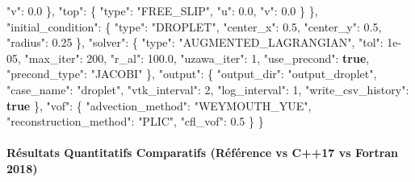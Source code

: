 \documentclass[
  10pt,
]{article}
\newenvironment{Shaded}{}{}
\newcommand{\DataTypeTok}[1]{\textcolor[rgb]{0.56,0.13,0.00}{#1}}
\newcommand{\DecValTok}[1]{\textcolor[rgb]{0.25,0.63,0.44}{#1}}
\newcommand{\FloatTok}[1]{\textcolor[rgb]{0.25,0.63,0.44}{#1}}
\newcommand{\FunctionTok}[1]{\textcolor[rgb]{0.02,0.16,0.49}{#1}}
\newcommand{\KeywordTok}[1]{\textcolor[rgb]{0.00,0.44,0.13}{\textbf{#1}}}
\newcommand{\StringTok}[1]{\textcolor[rgb]{0.25,0.44,0.63}{#1}}
\begin{document}
\begin{Shaded}
\begin{Highlighting}[]
      \DataTypeTok{"v"}\FunctionTok{:} \FloatTok{0.0}
    \FunctionTok{\},}
    \DataTypeTok{"top"}\FunctionTok{:} \FunctionTok{\{}
      \DataTypeTok{"type"}\FunctionTok{:} \StringTok{"FREE\_SLIP"}\FunctionTok{,}
      \DataTypeTok{"u"}\FunctionTok{:} \FloatTok{0.0}\FunctionTok{,}
      \DataTypeTok{"v"}\FunctionTok{:} \FloatTok{0.0}
    \FunctionTok{\}}
  \FunctionTok{\},}
  \DataTypeTok{"initial\_condition"}\FunctionTok{:} \FunctionTok{\{}
    \DataTypeTok{"type"}\FunctionTok{:} \StringTok{"DROPLET"}\FunctionTok{,}
    \DataTypeTok{"center\_x"}\FunctionTok{:} \FloatTok{0.5}\FunctionTok{,}
    \DataTypeTok{"center\_y"}\FunctionTok{:} \FloatTok{0.5}\FunctionTok{,}
    \DataTypeTok{"radius"}\FunctionTok{:} \FloatTok{0.25}
  \FunctionTok{\},}
  \DataTypeTok{"solver"}\FunctionTok{:} \FunctionTok{\{}
    \DataTypeTok{"type"}\FunctionTok{:} \StringTok{"AUGMENTED\_LAGRANGIAN"}\FunctionTok{,}
    \DataTypeTok{"tol"}\FunctionTok{:} \DecValTok{1e{-}05}\FunctionTok{,}
    \DataTypeTok{"max\_iter"}\FunctionTok{:} \DecValTok{200}\FunctionTok{,}
    \DataTypeTok{"r\_al"}\FunctionTok{:} \FloatTok{100.0}\FunctionTok{,}
    \DataTypeTok{"uzawa\_iter"}\FunctionTok{:} \DecValTok{1}\FunctionTok{,}
    \DataTypeTok{"use\_precond"}\FunctionTok{:} \KeywordTok{true}\FunctionTok{,}
    \DataTypeTok{"precond\_type"}\FunctionTok{:} \StringTok{"JACOBI"}
  \FunctionTok{\},}
  \DataTypeTok{"output"}\FunctionTok{:} \FunctionTok{\{}
    \DataTypeTok{"output\_dir"}\FunctionTok{:} \StringTok{"output\_droplet"}\FunctionTok{,}
    \DataTypeTok{"case\_name"}\FunctionTok{:} \StringTok{"droplet"}\FunctionTok{,}
    \DataTypeTok{"vtk\_interval"}\FunctionTok{:} \DecValTok{2}\FunctionTok{,}
    \DataTypeTok{"log\_interval"}\FunctionTok{:} \DecValTok{1}\FunctionTok{,}
    \DataTypeTok{"write\_csv\_history"}\FunctionTok{:} \KeywordTok{true}
  \FunctionTok{\},}
  \DataTypeTok{"vof"}\FunctionTok{:} \FunctionTok{\{}
    \DataTypeTok{"advection\_method"}\FunctionTok{:} \StringTok{"WEYMOUTH\_YUE"}\FunctionTok{,}
    \DataTypeTok{"reconstruction\_method"}\FunctionTok{:} \StringTok{"PLIC"}\FunctionTok{,}
    \DataTypeTok{"cfl\_vof"}\FunctionTok{:} \FloatTok{0.5}
  \FunctionTok{\}}
\FunctionTok{\}}
\end{Highlighting}
\end{Shaded}

\paragraph{Résultats Quantitatifs Comparatifs (Référence vs C++17 vs
Fortran
2018)}\label{ruxe9sultats-quantitatifs-comparatifs-ruxe9fuxe9rence-vs-c17-vs-fortran-2018-11}
\end{document}
